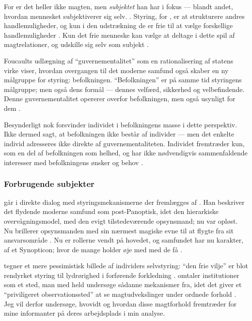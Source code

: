 For \citeauthor{foucaultSubjectPower1982} er det heller ikke magten, men \textit{subjektet} han har i fokus — blandt andet, hvordan mennesket subjektiverer sig selv. \autocite[s. 777f]{foucaultSubjectPower1982}.
Styring, for \citeauthor{foucaultSubjectPower1982}, er at strukturere andres handlemuligheder, og kun i den udstrækning de er frie til at vælge forskellige handlemuligheder \autocite[s. 790]{foucaultSubjectPower1982}.
Kun det frie menneske kan vælge at deltage i dette spil af magtrelationer, og udskille sig selv som subjekt \autocite[s. 789]{foucaultSubjectPower1982}.

Foucaults udlægning af “guvernementalitet” som en rationalisering af statens virke viser, hvordan overgangen til det moderne samfund også skaber en ny målgruppe for styring: befolkningen.
“Befolkningen” er på samme tid styringens målgruppe; men også dens formål — dennes velfærd, sikkerhed og velbefindende.
Denne guvernementalitet opererer overfor befolkningen, men også usynligt for dem \autocite[s 216ff]{foucaultGovernmentality2000}.

Besynderligt nok forsvinder individet i befolkningens masse i dette perspektiv.
Ikke dermed sagt, at befolkningen ikke består af individer — men det enkelte individ adresseres ikke direkte af guvernementaliteten.
Individet fremtræder kun, som en del af befolkningen som helhed, og har ikke nødvendigvis sammenfaldende interesser med befolkningens ønsker og behov \autocite[s. 217]{foucaultGovernmentality2000}.

\subsubsection{Forbrugende subjekter}

\citeauthor{baumanLiquidModernity2000} går i direkte dialog med styringsmekanismerne der fremlægges af \citeauthor{foucaultOvervagningOgStraf2005}.
Han beskriver det flydende moderne samfund som post-Panoptisk, idet den hierarkiske overvågningsmodel, med den evigt tilstedeværende opsynsmand; nu var opløst.
Nu brillerer opsynsmanden med sin nærmest magiske evne til at flygte fra sit ansvarsområde \autocite[s. 11]{baumanLiquidModernity2000}.
Nu er rollerne vendt på hovedet, og samfundet har nu karakter, af et Synopticon; hvor de mange holder øje med med de få \autocite[s. 85f]{baumanLiquidModernity2000}.

\citeauthor{baumanLiquidModernity2000} tegner et mere pessimistisk billede af individers selvstyring: “den frie vilje” er blot rendyrket styring til lydrørighed i forførende forkledning \autocite[s. 86]{baumanLiquidModernity2000}. 
\citeauthor{foucaultSubjectPower1982} omtaler institutioner som et sted, man med held undersøge sådanne mekanismer fra, idet det giver et “priviligeret observationssted” at se magtudvekslinger under ordnede forhold \autocite[s 791]{foucaultSubjectPower1982}.
Jeg vil derfor undersøge, hvovidt og hvordan disse magtforhold fremtræder for mine informanter på deres arbejdsplads i min analyse.

